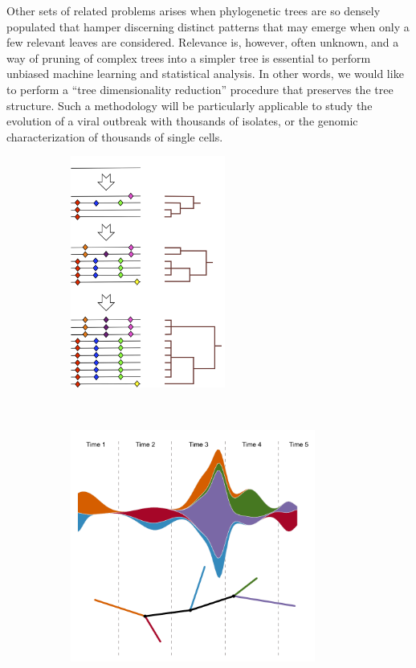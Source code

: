\documentclass[a4paper,11pt]{article}
\begin{document}
Other sets of related problems arises when phylogenetic trees are so densely populated that hamper discerning distinct patterns that may emerge when only a few relevant leaves are considered.
Relevance is, however, often unknown, and a way of pruning of complex trees into a simpler tree is essential to perform unbiased machine learning and statistical analysis.
In other words, we would like to perform a ``tree dimensionality reduction'' procedure that preserves the tree structure.
Such a methodology will be particularly applicable to study the evolution of a viral outbreak with thousands of isolates, or the genomic characterization of thousands of single cells.

\begin{figure}
    \begin{subfigure}{0.5\linewidth}
    \centering
    \includegraphics[height=3in]{../figures/illustration_clonal_tree.png}
    \end{subfigure}
    ~
    \begin{subfigure}{0.5\linewidth}
    \centering
    \includegraphics[height=3in]{../figures/illustration_longitudinal.pdf}

\end{subfigure}
\end{figure}
\end{document}
